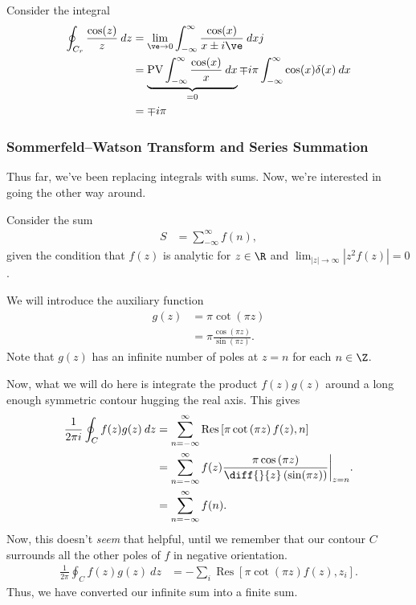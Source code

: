 \documentclass[10pt]{mypackage}
\DeclareMathOperator{\res}{Res}
\begin{document}
   \begin{example}
     Consider the integral
     \begin{align*}
               \oint_{C_r}^{} \frac{\cos(z)}{z}\:dz &= \lim_{\ve\rightarrow 0} \int_{-\infty}^{\infty} \frac{\cos(x)}{x\pm i\ve}\:dxj\\
                                                    &= \underbrace{\text{PV}\int_{-\infty}^{\infty} \frac{\cos(x)}{x}\:dx}_{=0} \mp i\pi \int_{-\infty}^{\infty} \cos(x)\delta(x)\:dx\\
                                                    &= \mp i\pi
     \end{align*}
   \end{example}
   \subsubsection{Sommerfeld--Watson Transform and Series Summation}%
   Thus far, we've been replacing integrals with sums. Now, we're interested in going the other way around.\newline

   Consider the sum
   \begin{align*}
     S &= \sum_{-\infty}^{\infty}f(n),
   \end{align*}
   given the condition that $f(z)$ is analytic for $z\in\R$ and $\lim_{|z|\rightarrow\infty}\left\vert z^2f(z) \right\vert = 0$.\newline

   We will introduce the auxiliary function
   \begin{align*}
     g(z) &= \pi \cot\left( \pi z \right)\\
          &= \pi \frac{\cos\left( \pi z \right)}{\sin\left( \pi z \right)}.
   \end{align*}
   Note that $g(z)$ has an infinite number of poles at $z = n$ for each $n\in\Z$.\newline

   Now, what we will do here is integrate the product $f(z)g(z)$ around a long enough symmetric contour hugging the real axis. This gives
   \begin{align*}
     \frac{1}{2\pi i}\oint_{C} f(z)g(z)\:dz &= \sum_{n=-\infty}^{\infty}\res\left[ \pi \cot\left( \pi z \right)f(z),n \right]\\
                                            &= \sum_{n=-\infty}^{\infty} f(z)\frac{\pi\cos\left( \pi z \right)}{\diff{}{z}\left( \sin(\pi z) \right)}\biggr\vert_{z=n}.\\
                                            &= \sum_{n=-\infty}^{\infty}f(n).
   \end{align*}
   Now, this doesn't \textit{seem} that helpful, until we remember that our contour $C$ surrounds all the other poles of $f$ in negative orientation.
   \begin{align*}
     \frac{1}{2\pi}\oint_{C}f(z)g(z)\:dz &= -\sum_{i}\res\left[ \pi\cot\left( \pi z \right)f(z),z_i \right].
   \end{align*}
   Thus, we have converted our infinite sum into a finite sum.\newline
\end{document}
